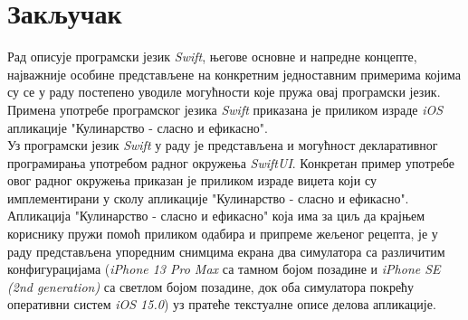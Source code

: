 \documentclass[12pt,oneside]{memoir}
\begin{document}



\chapter{Закључак}

\indent Рад описује програмски језик \textit{Swift}, његове основне и напредне концепте, најважније особине представљене на конкретним једноставним примерима којима су се у раду постепено уводиле могућности које пружа овај програмски језик. Примена употребе програмског језика \textit{Swift} приказана је приликом израде \textit{iOS} апликације "Кулинарство - сласно и ефикасно". 
\\
\indent Уз програмски језик \textit{Swift} у раду је представљена и могућност декларативног програмирања употребом радног окружења \textit{SwiftUI}. Конкретан пример употребе овог радног окружења приказан је приликом израде виџета који су имплементирани у сколу апликације "Кулинарство - сласно и ефикасно".
\\
\indent Апликација "Кулинарство - сласно и ефикасно" која има за циљ да крајњем кориснику пружи помоћ приликом одабира и припреме жељеног рецепта, је у раду представљена упоредним снимцима екрана два симулатора са различитим конфигурацијама (\textit{iPhone 13 Pro Max} са тамном бојом позадине и \textit{iPhone SE (2nd generation)} са светлом бојом позадине, док оба симулатора покрећу оперативни систем \textit{iOS 15.0}) уз пратеће текстуалне описе делова апликације. 
\\
\indent

\literatura
\end{document}
